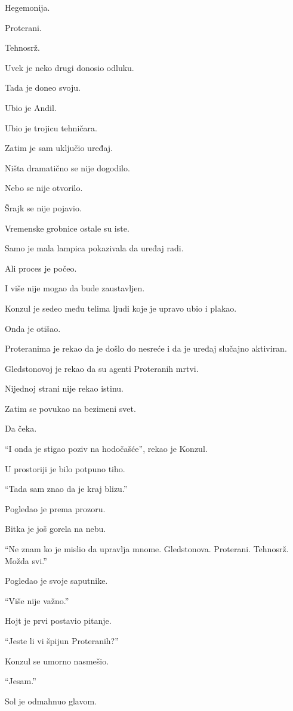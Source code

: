 Hegemonija.

Proterani.

Tehnosrž.

Uvek je neko drugi donosio odluku.

Tada je doneo svoju.

Ubio je Andil.

Ubio je trojicu tehničara.

Zatim je sam uključio uređaj.

\bigskip

Ništa dramatično se nije dogodilo.

Nebo se nije otvorilo.

Šrajk se nije pojavio.

Vremenske grobnice ostale su iste.

Samo je mala lampica pokazivala da uređaj radi.

Ali proces je počeo.

I više nije mogao da bude zaustavljen.

Konzul je sedeo među telima ljudi koje je upravo ubio i plakao.

Onda je otišao.

Proteranima je rekao da je došlo do nesreće i da je uređaj slučajno aktiviran.

Gledstonovoj je rekao da su agenti Proteranih mrtvi.

Nijednoj strani nije rekao istinu.

Zatim se povukao na bezimeni svet.

Da čeka.

\bigskip

``I onda je stigao poziv na hodočašće'', rekao je Konzul.

U prostoriji je bilo potpuno tiho.

``Tada sam znao da je kraj blizu.''

Pogledao je prema prozoru.

Bitka je još gorela na nebu.

``Ne znam ko je mislio da upravlja mnome. Gledstonova. Proterani. Tehnosrž. Možda svi.''

Pogledao je svoje saputnike.

``Više nije važno.''

Hojt je prvi postavio pitanje.

``Jeste li vi špijun Proteranih?''

Konzul se umorno nasmešio.

``Jesam.''

Sol je odmahnuo glavom.

